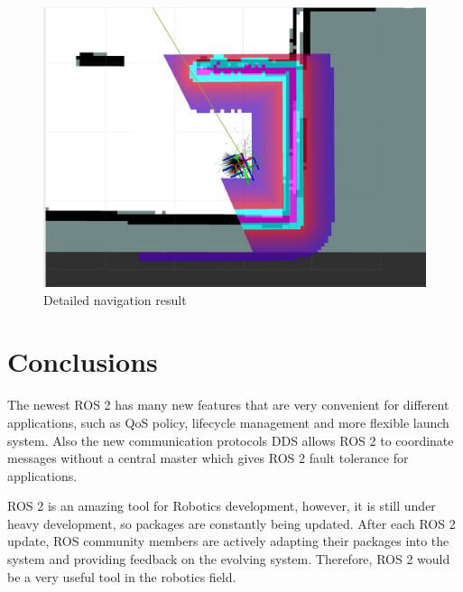 \documentclass[letterpaper, 10 pt, conference]{ieeeconf}  %
\begin{document}
\begin{figure}[!pt]
  \includegraphics[width=\linewidth]{navigation_detail.png}
  \caption{Detailed navigation result} 
  \label{fig:navigation_detail}
\end{figure}{}
\section{Conclusions}\label{conclusions}
The newest ROS 2 has many new features that are very convenient for different applications, such as QoS policy, lifecycle management and more flexible launch system. Also the new communication protocols DDS allows ROS 2 to coordinate messages without a central master which gives ROS 2 fault tolerance for applications. 

ROS 2 is an amazing tool for Robotics development, however, it is still under heavy development, so packages are constantly being updated. After each ROS 2 update, ROS community members are actively adapting their packages into the system and providing feedback on the evolving system. Therefore, ROS 2 would be a very useful tool in the robotics field.  

\addtolength{\textheight}{-12cm}   %
\end{document}
